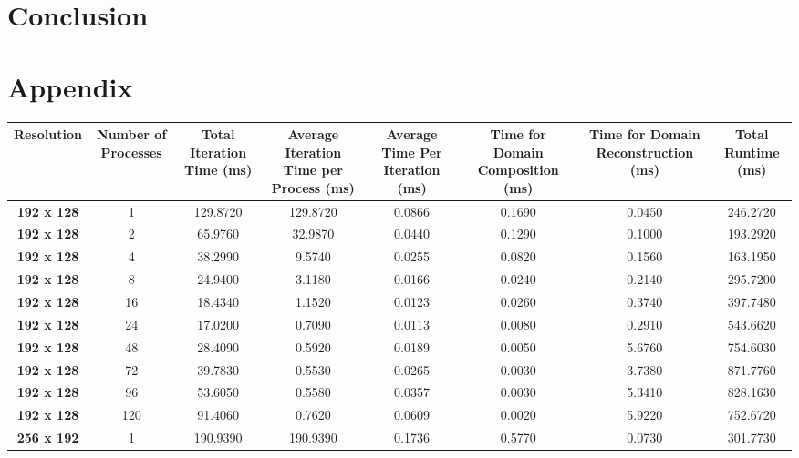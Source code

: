 \documentclass[11pt, a4paper]{article}
\begin{document}
	\section{Conclusion}
		
	\newpage
	\section{Appendix} \label{sect:appendix}
		\begin{table}
		  \centering
		   	\begin{tabular}{|c|c|c|c|c|c|c|c|}
				\hline
				\multicolumn{1}{|p{7.5em}|}{\textbf{Resolution}} & \multicolumn{1}{p{7.5em}|}{\textbf{Number of Processes}} & \multicolumn{1}{p{7.5em}|}{\textbf{Total Iteration Time (ms)}} & \multicolumn{1}{p{7.5em}|}{\textbf{Average Iteration Time per Process (ms)}} & \multicolumn{1}{p{7.5em}|}{\textbf{Average Time Per Iteration (ms)}} & \multicolumn{1}{p{7.5em}|}{\textbf{Time for Domain Composition (ms)}} & \multicolumn{1}{p{7.5em}|}{\textbf{Time for Domain Reconstruction (ms)}} & \multicolumn{1}{p{7.5em}|}{\textbf{Total Runtime (ms)}} \\
				\hline
				\textbf{192 x 128} & 1     & 129.8720 & 129.8720 & 0.0866 & 0.1690 & 0.0450 & 246.2720\\
				\textbf{192 x 128} & 2     & 65.9760 & 32.9870 & 0.0440 & 0.1290 & 0.1000 & 193.2920 \\
				\textbf{192 x 128} & 4     & 38.2990 & 9.5740 & 0.0255 & 0.0820 & 0.1560 & 163.1950 \\
				\textbf{192 x 128} & 8     & 24.9400 & 3.1180 & 0.0166 & 0.0240 & 0.2140 & 295.7200 \\
				\textbf{192 x 128} & 16    & 18.4340 & 1.1520 & 0.0123 & 0.0260 & 0.3740 & 397.7480 \\
				\textbf{192 x 128} & 24    & 17.0200 & 0.7090 & 0.0113 & 0.0080 & 0.2910 & 543.6620 \\
				\textbf{192 x 128} & 48    & 28.4090 & 0.5920 & 0.0189 & 0.0050 & 5.6760 & 754.6030 \\
				\textbf{192 x 128} & 72    & 39.7830 & 0.5530 & 0.0265 & 0.0030 & 3.7380 & 871.7760 \\
				\textbf{192 x 128} & 96    & 53.6050 & 0.5580 & 0.0357 & 0.0030 & 5.3410 & 828.1630 \\
				\textbf{192 x 128} & 120   & 91.4060 & 0.7620 & 0.0609 & 0.0020 & 5.9220 & 752.6720 \\
				\hline
				\textbf{256 x 192} & 1     & 190.9390 & 190.9390 & 0.1736 & 0.5770 & 0.0730 & 301.7730 \\

\end{tabular}
\end{table}
\end{document}
